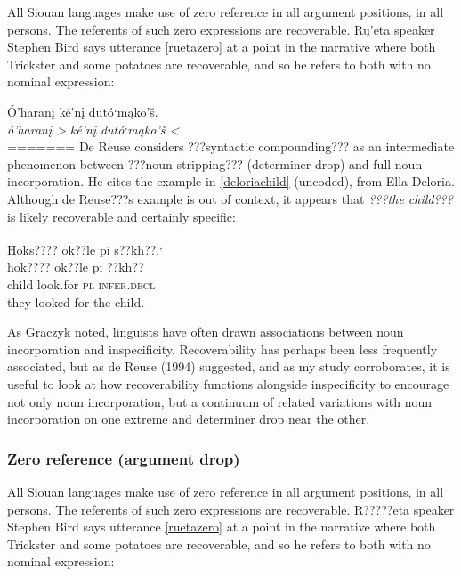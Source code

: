 \documentclass[output=paper]{LSP/langsci}
\begin{document}
	All Siouan languages make use of zero reference in all argument positions, in all persons. The referents of such zero expressions are recoverable. Rų’eta speaker Stephen Bird says utterance \ref{ruetazero} at a point in the narrative where both Trickster and some potatoes are recoverable, and so he refers to both with no nominal expression:
	
\ea\label{ruetazero}
 	Ó’haranį ké’nį dutóˑmąko’š.\footnotemark\\
\gll 	\emph{ó’haranį >}	\emph{ké’nį}		\emph{dutóˑmąko’š <}\\
=======
De Reuse considers ???syntactic compounding??? as an intermediate phenomenon between ???noun stripping??? (determiner drop) and full noun incorporation. He cites the example in \ref{deloriachild} (uncoded), from Ella Deloria. Although de Reuse???s example is out of context, it appears that \emph{???the child???} is likely recoverable and certainly specific:

\ea\label{deloriachild}
 	Hoks???? ok??le pi s??kh??.\footnotemark\textsuperscript{,} \footnotemark\\
\gll	hok????		ok??le		pi			??kh??\\
	child		look.for	\textsc{pl}		\textsc{infer.decl}\\
\glt	they looked for the child. 
\z

	As Graczyk noted, linguists have often drawn associations between noun incorporation and inspecificity. Recoverability has perhaps been less frequently associated, but as de Reuse (1994) suggested, and as my study corroborates, it is useful to look at how recoverability functions alongside inspecificity to encourage not only noun incorporation, but a continuum of related variations with noun incorporation on one extreme and determiner drop near the other.
	
\subsubsection{Zero reference (argument drop)}\label{zeroreference}

	All Siouan languages make use of zero reference in all argument positions, in all persons. The referents of such zero expressions are recoverable. R?????eta speaker Stephen Bird says utterance \ref{ruetazero} at a point in the narrative where both Trickster and some potatoes are recoverable, and so he refers to both with no nominal expression:
	
\end{document}
